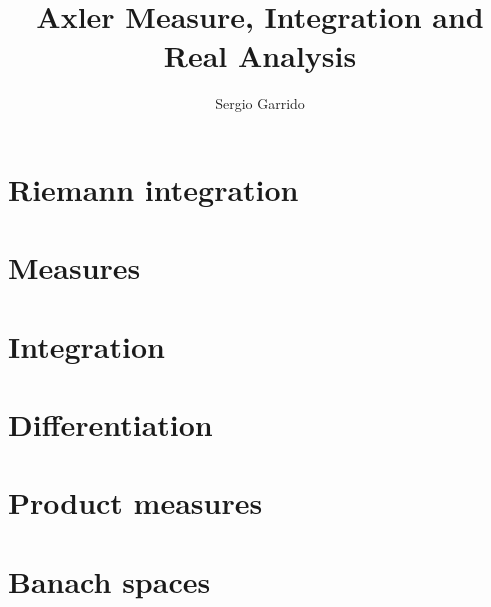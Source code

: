 \documentclass{bookSolutions}
\title{Axler Measure, Integration and Real Analysis}
\author{Sergio Garrido}
\begin{document}
\maketitle

\tableofcontents

\newpage

\chapter{Riemann integration}



\chapter{Measures}






\chapter{Integration}



\chapter{Differentiation}



\chapter{Product measures}




\chapter{Banach spaces}






% 

% 
\end{document}

